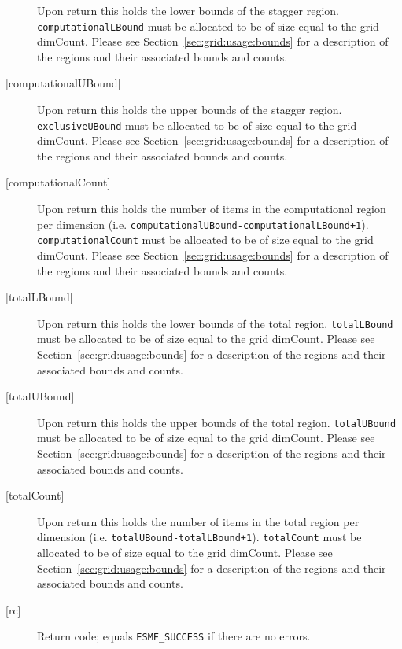 \begin{description}
            Upon return this holds the lower bounds of the stagger region.
            {\tt computationalLBound} must be allocated to be of size equal to the grid dimCount.
            Please see Section~\ref{sec:grid:usage:bounds} for a description
            of the regions and their associated bounds and counts.
       \item[{[computationalUBound]}]
            Upon return this holds the upper bounds of the stagger region.
            {\tt exclusiveUBound} must be allocated to be of size equal to the grid dimCount.
            Please see Section~\ref{sec:grid:usage:bounds} for a description
            of the regions and their associated bounds and counts.
       \item[{[computationalCount]}]
            Upon return this holds the number of items in the computational region per dimension
            (i.e. {\tt computationalUBound-computationalLBound+1}). {\tt computationalCount}
            must be allocated to be of size equal to the grid dimCount.
            Please see Section~\ref{sec:grid:usage:bounds} for a description
            of the regions and their associated bounds and counts.
       \item[{[totalLBound]}]
            Upon return this holds the lower bounds of the total region.
            {\tt totalLBound} must be allocated to be of size equal to the grid dimCount.
            Please see Section~\ref{sec:grid:usage:bounds} for a description
            of the regions and their associated bounds and counts.
       \item[{[totalUBound]}]
            Upon return this holds the upper bounds of the total region.
            {\tt totalUBound} must be allocated to be of size equal to the grid dimCount.
            Please see Section~\ref{sec:grid:usage:bounds} for a description
            of the regions and their associated bounds and counts.
       \item[{[totalCount]}]
            \begin{sloppypar}
            Upon return this holds the number of items in the total region per dimension
            (i.e. {\tt totalUBound-totalLBound+1}). {\tt totalCount} must
            be allocated to be of size equal to the grid dimCount.
            Please see Section~\ref{sec:grid:usage:bounds} for a description
            of the regions and their associated bounds and counts.
            \end{sloppypar}
       \item[{[rc]}]
            Return code; equals {\tt ESMF\_SUCCESS} if there are no errors.
     \end{description}
   
